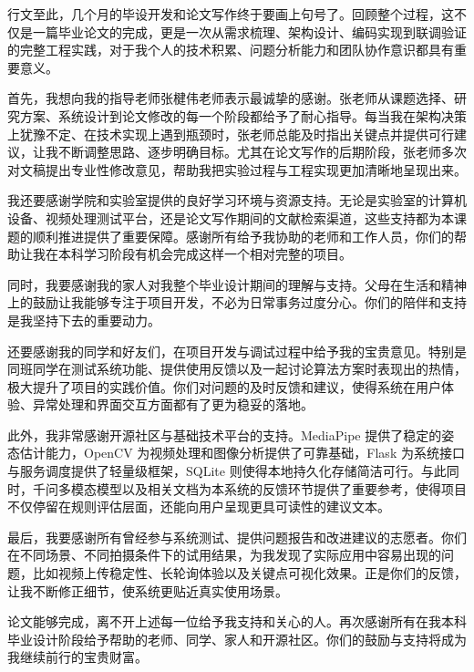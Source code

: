 {\songti{}
\setlength{\parindent}{2em}
\indent 行文至此，几个月的毕设开发和论文写作终于要画上句号了。回顾整个过程，这不仅是一篇毕业论文的完成，更是一次从需求梳理、架构设计、编码实现到联调验证的完整工程实践，对于我个人的技术积累、问题分析能力和团队协作意识都具有重要意义。

\indent 首先，我想向我的指导老师张楗伟老师表示最诚挚的感谢。张老师从课题选择、研究方案、系统设计到论文修改的每一个阶段都给予了耐心指导。每当我在架构决策上犹豫不定、在技术实现上遇到瓶颈时，张老师总能及时指出关键点并提供可行建议，让我不断调整思路、逐步明确目标。尤其在论文写作的后期阶段，张老师多次对文稿提出专业性修改意见，帮助我把实验过程与工程实现更加清晰地呈现出来。

\indent 我还要感谢学院和实验室提供的良好学习环境与资源支持。无论是实验室的计算机设备、视频处理测试平台，还是论文写作期间的文献检索渠道，这些支持都为本课题的顺利推进提供了重要保障。感谢所有给予我协助的老师和工作人员，你们的帮助让我在本科学习阶段有机会完成这样一个相对完整的项目。

\indent 同时，我要感谢我的家人对我整个毕业设计期间的理解与支持。父母在生活和精神上的鼓励让我能够专注于项目开发，不必为日常事务过度分心。你们的陪伴和支持是我坚持下去的重要动力。

\indent 还要感谢我的同学和好友们，在项目开发与调试过程中给予我的宝贵意见。特别是同班同学在测试系统功能、提供使用反馈以及一起讨论算法方案时表现出的热情，极大提升了项目的实践价值。你们对问题的及时反馈和建议，使得系统在用户体验、异常处理和界面交互方面都有了更为稳妥的落地。

\indent 此外，我非常感谢开源社区与基础技术平台的支持。MediaPipe 提供了稳定的姿态估计能力，OpenCV 为视频处理和图像分析提供了可靠基础，Flask 为系统接口与服务调度提供了轻量级框架，SQLite 则使得本地持久化存储简洁可行。与此同时，千问多模态模型以及相关文档为本系统的反馈环节提供了重要参考，使得项目不仅停留在规则评估层面，还能向用户呈现更具可读性的建议文本。

\indent 最后，我要感谢所有曾经参与系统测试、提供问题报告和改进建议的志愿者。你们在不同场景、不同拍摄条件下的试用结果，为我发现了实际应用中容易出现的问题，比如视频上传稳定性、长轮询体验以及关键点可视化效果。正是你们的反馈，让我不断修正细节，使系统更贴近真实使用场景。

\indent 论文能够完成，离不开上述每一位给予我支持和关心的人。再次感谢所有在我本科毕业设计阶段给予帮助的老师、同学、家人和开源社区。你们的鼓励与支持将成为我继续前行的宝贵财富。
}
